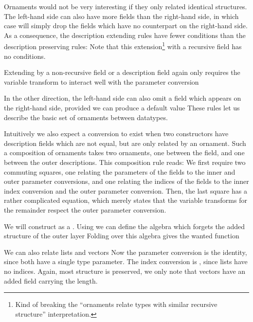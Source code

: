 \begin{outline}
Ornaments would not be very interesting if they only related identical structures. The left-hand side can also have more fields than the right-hand side, in which case  will simply drop the fields which have no counterpart on the right-hand side. As a consequence, the description extending rules have fewer conditions than the description preserving rules: 
Note that this extension\footnote{Kind of breaking the ``ornaments relate types with similar recursive structure'' interpretation.} with a recursive field has no conditions.

Extending by a non-recursive field or a description field again only requires the variable transform to interact well with the parameter conversion

In the other direction, the left-hand side can also omit a field which appears on the right-hand side, provided we can produce a default value
These rules let us describe the basic set of ornaments between datatypes.

Intuitively we also expect a conversion to exist when two constructors have description fields which are not equal, but are only related by an ornament. Such a composition of ornaments takes two ornaments, one between the field, and one between the outer descriptions. This composition rule reads:
We first require two commuting squares, one relating the parameters of the fields to the inner and outer parameter conversions, and one relating the indices of the fields to the inner index conversion and the outer parameter conversion. Then, the last square has a rather complicated equation, which merely states that the variable transforms for the remainder respect the outer parameter conversion.

We will construct  as a . Using
we can define the algebra which forgets the added structure of the outer layer
Folding over this algebra gives the wanted function


We can also relate lists and vectors
Now the parameter conversion is the identity, since both have a single type parameter. The index conversion is \AgdaFunction{!}, since lists have no indices. Again, most structure is preserved, we only note that vectors have an added field carrying the length.


\end{outline}
